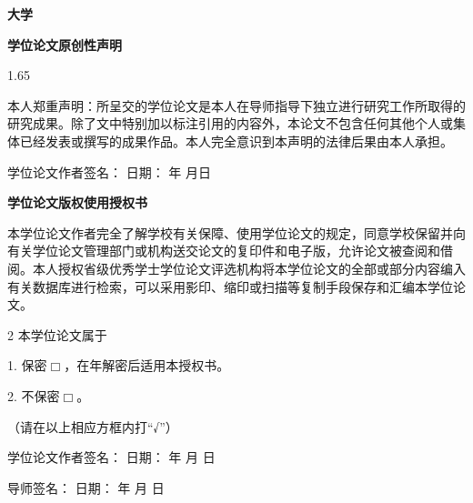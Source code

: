 \thispagestyle{empty}
\centerline{\bf{\kai{}大学}}\vspace*{15pt}

\centerline{\bf \kai{}学位论文原创性声明}%
\vspace*{40pt}

\begin{spacing}{1.65}
	
	本人郑重声明：所呈交的学位论文是本人在导师指导下独立进行研究工作所取得的研究成果。除了文中特别加以标注引用的内容外，本论文不包含任何其他个人或集体已经发表或撰写的成果作品。本人完全意识到本声明的法律后果由本人承担。
	
	{\hspace*{3.5\ccwd}\fangsong 学位论文作者签名：}\hspace*{3cm}  日期：\hspace*{1.2cm} 年\hspace*{.6cm} 月\hspace*{.6cm}日\hfill
	
	\vspace*{50pt}
	\centerline{\bf \kai 学位论文版权使用授权书}
	\medskip
	
	本学位论文作者完全了解学校有关保障、使用学位论文的规定，同意学校保留并向有关学位论文管理部门或机构送交论文的复印件和电子版，允许论文被查阅和借阅。本人授权省级优秀学士学位论文评选机构将本学位论文的全部或部分内容编入有关数据库进行检索，可以采用影印、缩印或扫描等复制手段保存和汇编本学位论文。\vspace*{1.9cm}
\end{spacing}

\begin{spacing}{2}
	本学位论文属于
	
	1. 保密\quad $\Box$\quad，在\underline{}年解密后适用本授权书。
	
	2. 不保密\quad $\Box$。
	
	（请在以上相应方框内打“√”）
	
	{\fangsong 学位论文作者签名：}\hspace*{3cm}  日期：\hspace*{1.45cm} 年  \hspace*{.6cm} 月\hspace*{.6cm} 日\hfill
	
	{\fangsong 导师签名：}\hspace*{4.7cm}  日期：\hspace*{1.45cm} 年 \hspace*{.6cm} 月 \hspace*{.6cm} 日\hfill
\end{spacing}
\restoregeometry

